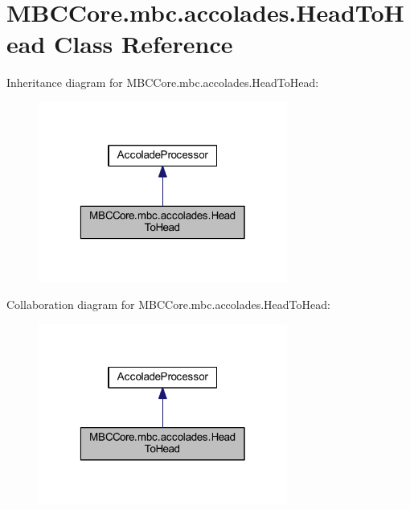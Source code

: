 \hypertarget{class_m_b_c_core_1_1mbc_1_1accolades_1_1_head_to_head}{\section{M\-B\-C\-Core.\-mbc.\-accolades.\-Head\-To\-Head Class Reference}
\label{class_m_b_c_core_1_1mbc_1_1accolades_1_1_head_to_head}
}


Inheritance diagram for M\-B\-C\-Core.\-mbc.\-accolades.\-Head\-To\-Head\-:\nopagebreak
\begin{figure}[H]
\begin{center}
\leavevmode
\includegraphics[width=232pt]{class_m_b_c_core_1_1mbc_1_1accolades_1_1_head_to_head__inherit__graph}
\end{center}
\end{figure}


Collaboration diagram for M\-B\-C\-Core.\-mbc.\-accolades.\-Head\-To\-Head\-:\nopagebreak
\begin{figure}[H]
\begin{center}
\leavevmode
\includegraphics[width=232pt]{class_m_b_c_core_1_1mbc_1_1accolades_1_1_head_to_head__coll__graph}
\end{center}
\end{figure}
